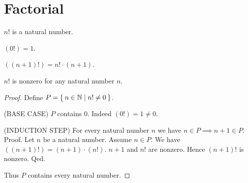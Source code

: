 \documentclass[../../natural-numbers.ftl.tex]{subfiles}
\begin{document}


  \section{Factorial}

  \begin{forthel}
    \begin{signature}
      $n!$ is a natural number.
    \end{signature}

    \begin{axiom}
      $(0!) = 1$.
    \end{axiom}

    \begin{axiom}
      $((n + 1)!) = n! \cdot (n + 1)$.
    \end{axiom}


    \begin{proposition}
      $n!$ is nonzero for any natural number $n$.
    \end{proposition}
    \begin{proof}
      Define $P = \Set{n \in \mathbb{N} | n! \neq 0}$.

      (BASE CASE) $P$ contains $0$.
      Indeed $(0!) = 1 \neq 0$.

      (INDUCTION STEP) For every natural number $n$ we have $n \in P \implies n + 1 \in P$. \\
      Proof.
        Let $n$ be a natural number.
        Assume $n \in P$.
        We have $((n + 1)!) = (n + 1) \cdot (n!)$.
        $n + 1$ and $n!$ are nonzero.
        Hence $(n + 1)!$ is nonzero.
      Qed.

      Thus $P$ contains every natural number.
    \end{proof}
  \end{forthel}
\end{document}
